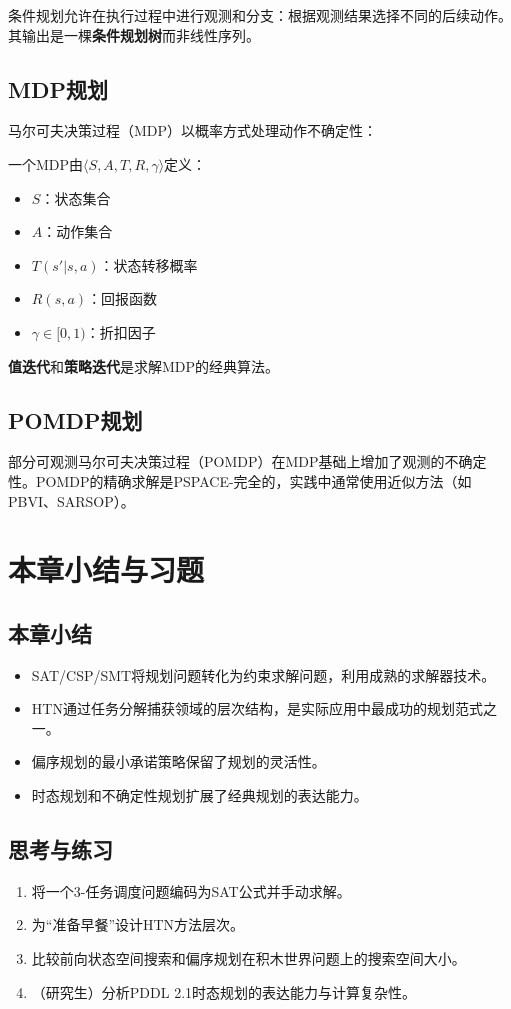 条件规划允许在执行过程中进行观测和分支：根据观测结果选择不同的后续动作。其输出是一棵\textbf{条件规划树}而非线性序列。

\subsection{MDP规划 \grad}

马尔可夫决策过程（MDP）以概率方式处理动作不确定性：

\begin{definition}[MDP]
一个MDP由$\langle S, A, T, R, \gamma \rangle$定义：
\begin{itemize}
  \item $S$：状态集合
  \item $A$：动作集合
  \item $T(s'|s,a)$：状态转移概率
  \item $R(s,a)$：回报函数
  \item $\gamma \in [0,1)$：折扣因子
\end{itemize}
\end{definition}

\textbf{值迭代}和\textbf{策略迭代}是求解MDP的经典算法。

\subsection{POMDP规划 \self}

部分可观测马尔可夫决策过程（POMDP）在MDP基础上增加了观测的不确定性。POMDP的精确求解是PSPACE-完全的，实践中通常使用近似方法（如PBVI、SARSOP）。

\section{本章小结与习题}

\subsection*{本章小结}
\begin{itemize}
  \item SAT/CSP/SMT将规划问题转化为约束求解问题，利用成熟的求解器技术。
  \item HTN通过任务分解捕获领域的层次结构，是实际应用中最成功的规划范式之一。
  \item 偏序规划的最小承诺策略保留了规划的灵活性。
  \item 时态规划和不确定性规划扩展了经典规划的表达能力。
\end{itemize}

\subsection*{思考与练习}
\begin{enumerate}
  \item 将一个3-任务调度问题编码为SAT公式并手动求解。
  \item 为``准备早餐''设计HTN方法层次。
  \item 比较前向状态空间搜索和偏序规划在积木世界问题上的搜索空间大小。
  \item （研究生）分析PDDL 2.1时态规划的表达能力与计算复杂性。
\end{enumerate}
